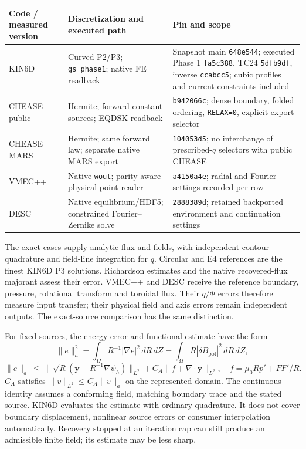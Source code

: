 \documentclass[10pt,a4paper]{article}
\newcommand{\Bpol}{B_{\mathrm{pol}}}
\begin{document}
\begin{center}\small
\begin{tabular}{p{31mm}p{45mm}p{77mm}}
\toprule
Code / measured version & Discretization and executed path & Pin and scope \\
\midrule
KIN6D & Curved P2/P3; \texttt{gs\_phase1}; native FE readback & Snapshot main \texttt{648e544}; executed Phase 1 \texttt{fa5c388}, TC24 \texttt{5dfb9df}, inverse \texttt{ccabcc5}; cubic profiles and current constraints included \\
CHEASE public & Hermite; forward constant sources; EQDSK readback & \texttt{b942066c}; dense boundary, folded ordering, \texttt{RELAX=0}, explicit export selector \\
CHEASE MARS & Hermite; same forward law; separate native MARS export & \texttt{104053d5}; no interchange of prescribed-$q$ selectors with public CHEASE \\
VMEC++ & Native \texttt{wout}; parity-aware physical-point reader & \texttt{a4150a4e}; radial and Fourier settings recorded per row \\
DESC & Native equilibrium/HDF5; constrained Fourier--Zernike solve & \texttt{2888389d}; retained backported environment and continuation settings \\
\bottomrule
\end{tabular}
\end{center}

The exact cases supply analytic flux and fields, with independent contour
quadrature and field-line integration for $q$. Circular and E4 references are
the finest KIN6D P3 solutions. Richardson estimates and the native recovered-flux
majorant assess their error. VMEC++ and DESC receive the reference boundary,
pressure, rotational transform and toroidal flux. Their $q/\Phi$ errors therefore
measure input transfer; their physical field and axis errors remain independent
outputs. The exact-source comparison has the same distinction.

For fixed sources, the energy error and functional estimate have the form
\[
\|e\|_a^2=\int_\Omega R^{-1}|\nabla e|^2\,dR\,dZ
          =\int_\Omega R|\delta\Bpol|^2\,dR\,dZ,
\]
\[
\|e\|_a\ \leq\ \|\sqrt R(\mathbf y-R^{-1}\nabla\psi_h)\|_{L^2}
       +C_A\|f+\nabla\cdot\mathbf y\|_{L^2},
\quad f=\mu_0Rp'+FF'/R.
\]
$C_A$ satisfies $\|v\|_{L^2}\leq C_A\|v\|_a$ on the represented domain.
The continuous identity assumes a conforming field, matching boundary trace
and the stated source. KIN6D evaluates the estimate with ordinary quadrature.
It does not cover boundary displacement, nonlinear source errors or consumer
interpolation automatically. Recovery stopped at an iteration cap can still
produce an admissible finite field; its estimate may be less sharp.
\end{document}
